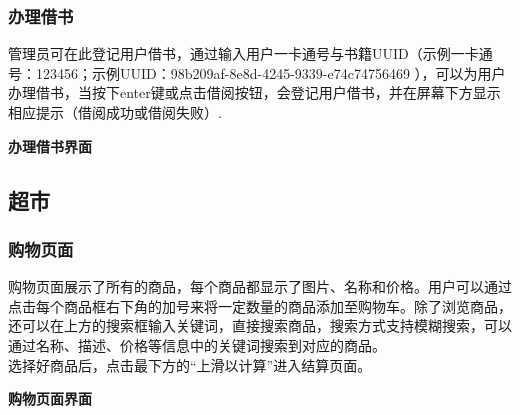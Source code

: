 \documentclass{article}
\begin{document}
\subsubsection{办理借书}
管理员可在此登记用户借书，通过输入用户一卡通号与书籍UUID（示例一卡通号：123456；示例UUID：98b209af-8e8d-4245-9339-e74c74756469
），可以为用户办理借书，当按下enter键或点击借阅按钮，会登记用户借书，并在屏幕下方显示相应提示（借阅成功或借阅失败）.

\begin{center}
\textbf{办理借书界面}
\end{center}


\subsection{超市}


\subsubsection{购物页面}

购物页面展示了所有的商品，每个商品都显示了图片、名称和价格。用户可以通过点击每个商品框右下角的加号来将一定数量的商品添加至购物车。除了浏览商品，还可以在上方的搜索框输入关键词，直接搜索商品，搜索方式支持模糊搜索，可以通过名称、描述、价格等信息中的关键词搜索到对应的商品。\\
选择好商品后，点击最下方的“上滑以计算”进入结算页面。

\begin{center}
\textbf{购物页面界面}
\end{center}
\end{document}
